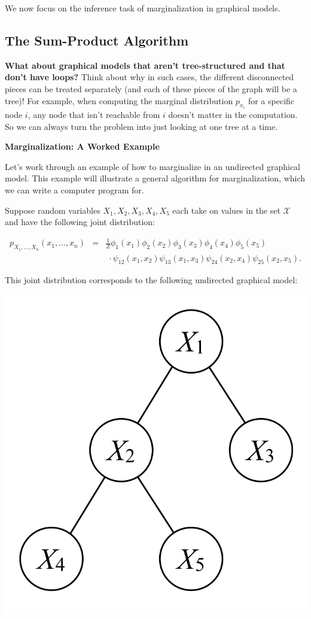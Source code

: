 \documentclass[6008notes.tex]{subfiles}
\begin{document}
We now focus on the inference task of marginalization in graphical models.


\subsection{The Sum-Product Algorithm}

\textbf{What about graphical models that aren't tree-structured and that don't have loops?} Think about why in such cases, the different disconnected pieces can be treated separately (and each of these pieces of the graph will be a tree)! For example, when computing the marginal distribution $p_{x_i}$ for a specific node $i$, any node that isn't reachable from $i$ doesn't matter in the computation. So we can always turn the problem into just looking at one tree at a time.

\textbf{Marginalization: A Worked Example}

Let's work through an example of how to marginalize in an undirected graphical model. This example will illustrate a general algorithm for marginalization, which we can write a computer program for.

Suppose random variables $X_1,X_2,X_3,X_4,X_5$ each take on values in the set $\mathcal{X}$ and have the following joint distribution:

\begin{eqnarray*}
p_{X_1, \dots, X_n}(x_1, \dots, x_n)
&=& \frac{1}{Z}\phi_{1}(x_{1})\phi_{2}(x_{2})\phi_{3}(x_{3})\phi_{4}(x_{4})\phi_{5}(x_{5}) \\
&& \;
\cdot \psi_{12}(x_{1},x_{2})\psi_{13}(x_{1},x_{3})\psi_{24}(x_{2},x_{4})\psi_{25}(x_{2},x_{5}).
\end{eqnarray*}

This joint distribution corresponds to the following undirected graphical model:

{\centering\includegraphics[scale=0.4]{images_sec-graphical-models-five-node-example} \par}
\end{document}
